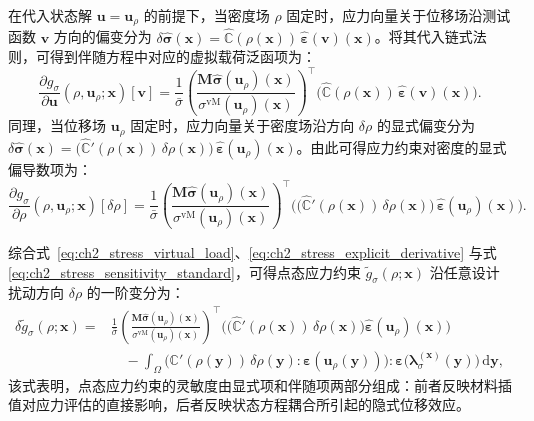 在代入状态解 $\boldsymbol{u} = \boldsymbol{u}_\rho$ 的前提下，当密度场 $\rho$ 固定时，应力向量关于位移场沿测试函数 $\boldsymbol{v}$ 方向的偏变分为 $\delta\hat{\boldsymbol{\sigma}}(\boldsymbol{x}) = \hat{\mathbb{C}}(\rho(\boldsymbol{x}))\,\hat{\boldsymbol{\varepsilon}}(\boldsymbol{v})(\boldsymbol{x})$。将其代入链式法则，可得到伴随方程中对应的虚拟载荷泛函项为：
\begin{equation} \label{eq:ch2_stress_virtual_load}
	\frac{\partial g_\sigma}{\partial \boldsymbol{u}}(\rho,\boldsymbol{u}_\rho;\boldsymbol{x})[\boldsymbol{v}] = \frac{1}{\bar{\sigma}} \left(\frac{\boldsymbol{M}\hat{\boldsymbol{\sigma}}(\boldsymbol{u}_\rho)(\boldsymbol{x})}{\sigma^{\mathrm{vM}}(\boldsymbol{u}_\rho)(\boldsymbol{x})}\right)^{\!\top} \Big(\hat{\mathbb{C}}(\rho(\boldsymbol{x}))\,\hat{\boldsymbol{\varepsilon}}(\boldsymbol{v})(\boldsymbol{x})\Big).
\end{equation}
同理，当位移场 $\boldsymbol{u}_\rho$ 固定时，应力向量关于密度场沿方向 $\delta\rho$ 的显式偏变分为 $\delta\hat{\boldsymbol{\sigma}}(\boldsymbol{x}) = \big(\hat{\mathbb{C}}'(\rho(\boldsymbol{x}))\,\delta\rho(\boldsymbol{x})\big)\, \hat{\boldsymbol{\varepsilon}}(\boldsymbol{u}_\rho)(\boldsymbol{x})$。由此可得应力约束对密度的显式偏导数项为：
\begin{equation} \label{eq:ch2_stress_explicit_derivative}
	\frac{\partial g_\sigma}{\partial \rho}(\rho,\boldsymbol{u}_\rho;\boldsymbol{x})[\delta\rho] = \frac{1}{\bar{\sigma}} \left(\frac{\boldsymbol{M}\hat{\boldsymbol{\sigma}}(\boldsymbol{u}_\rho)(\boldsymbol{x})}{\sigma^{\mathrm{vM}}(\boldsymbol{u}_\rho)(\boldsymbol{x})}\right)^{\!\top} \Big(\big(\hat{\mathbb{C}}'(\rho(\boldsymbol{x}))\,\delta\rho(\boldsymbol{x})\big)\, \hat{\boldsymbol{\varepsilon}}(\boldsymbol{u}_\rho)(\boldsymbol{x})\Big).
\end{equation}

综合式~\eqref{eq:ch2_stress_virtual_load}、\eqref{eq:ch2_stress_explicit_derivative} 与式 \eqref{eq:ch2_stress_sensitivity_standard}，可得点态应力约束 $\tilde g_\sigma(\rho;\boldsymbol{x})$ 沿任意设计扰动方向 $\delta \rho$ 的一阶变分为：
\begin{equation} \label{eq:ch2_stress_total_variation}
	\begin{aligned} 
		\delta \tilde g_\sigma(\rho;\boldsymbol{x}) ={}& \frac{1}{\bar{\sigma}} \left( \frac{ \boldsymbol{M}\hat{\boldsymbol{\sigma}}(\boldsymbol{u}_\rho)(\boldsymbol{x}) }{ \sigma^{\mathrm{vM}}(\boldsymbol{u}_\rho)(\boldsymbol{x}) } \right)^\top \Big( \big( \hat{\mathbb{C}}'(\rho(\boldsymbol{x}))\,\delta \rho(\boldsymbol{x}) \big) \hat{\boldsymbol{\varepsilon}}(\boldsymbol{u}_\rho)(\boldsymbol{x}) \Big) \\ &\quad - \int_\Omega \big( \mathbb{C}'(\rho(\boldsymbol{y}))\,\delta \rho(\boldsymbol{y}) : \boldsymbol{\varepsilon}(\boldsymbol{u}_\rho(\boldsymbol{y})) \big) : \boldsymbol{\varepsilon}\big(\boldsymbol{\lambda}_\sigma^{(\boldsymbol{x})}(\boldsymbol{y})\big) \,\mathrm{d}\boldsymbol{y}, 
	\end{aligned}
\end{equation}
该式表明，点态应力约束的灵敏度由显式项和伴随项两部分组成：前者反映材料插值对应力评估的直接影响，后者反映状态方程耦合所引起的隐式位移效应。


